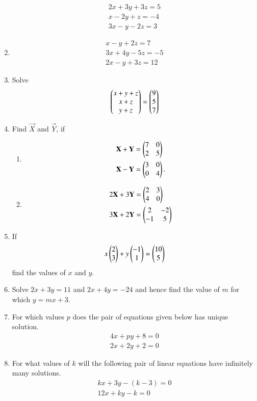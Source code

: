 \begin{enumerate}[label=\thesubsection.\arabic*,ref=\thesubsection.\theenumi]
\begin{align}
 2x+3y+3z = 5\\
 x-2y+z = -4\\
 3x-y-2z = 3
\end{align}
\item   \label{prob:14}
\begin{align}
 x-y+2z = 7\\
 3x+4y-5z = -5\\
 2x-y+3z = 12
\end{align}
\item Solve
\begin{align}
\begin{pmatrix}x+y+z \\ x+z \\ y+z \end{pmatrix}=
\begin{pmatrix}9 \\ 5 \\  7\end{pmatrix}
\end{align}
\item Find $\vec{X}$ and $\vec{Y}$, if
\begin{enumerate}
\item 
\begin{align}
	\mathbf{X}+\mathbf{Y}&= \begin{pmatrix}7 & 0 \\ 2 & 5\end{pmatrix} 
\\
		\mathbf{X}-\mathbf{Y}&=\begin{pmatrix}3 & 0 \\ 0 & 4\end{pmatrix}.
\end{align}
\item 
\begin{align}
	2\mathbf{X}+3\mathbf{Y}&=\begin{pmatrix}2 & 3 \\ 4 & 0\end{pmatrix}  
	\\
	3\mathbf{X}+2\mathbf{Y}&=\begin{pmatrix}2 & -2 \\ -1 & 5\end{pmatrix}
\end{align}
\end{enumerate}
\item If 
\begin{align}
	x \begin{pmatrix}2 \\ 3\end{pmatrix} + y \begin{pmatrix}-1 \\ 1\end{pmatrix}= \begin{pmatrix}10 \\ 5\end{pmatrix}
\end{align}
find the values of $x$ and $y$.
\item Solve $2x+3y=11$ and $2x+4y=-24$ and hence find the value of $m$ for which $y=mx+3$.
\item For which values $p$ does the pair of equations given below has unique solution.
\begin{align}
4x+py+8 = 0 \\ 2x+2y+2 = 0
\end{align}
\item For what values of $k$ will the following pair of linear equations have infinitely many solutions.
\begin{align}
kx+3y-(k-3) = 0 \\ 12x+ky-k = 0
\end{align}
\end{enumerate}
